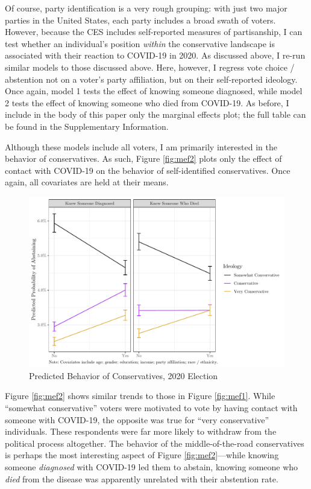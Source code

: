 \documentclass[
  12pt,
]{article}
\begin{document}
Of course, party identification is a very rough grouping: with just two major parties in the United States, each party includes a broad swath of voters. However, because the CES includes self-reported measures of partisanship, I can test whether an individual's position \emph{within} the conservative landscape is associated with their reaction to COVID-19 in 2020. As discussed above, I re-run similar models to those discussed above. Here, however, I regress vote choice / abstention not on a voter's party affiliation, but on their self-reported ideology. Once again, model 1 tests the effect of knowing someone diagnosed, while model 2 tests the effect of knowing someone who died from COVID-19. As before, I include in the body of this paper only the marginal effects plot; the full table can be found in the Supplementary Information.

Although these models include all voters, I am primarily interested in the behavior of conservatives. As such, Figure \ref{fig:mef2} plots only the effect of contact with COVID-19 on the behavior of self-identified conservatives. Once again, all covariates are held at their means.

\begin{figure}[H]

{\centering \includegraphics{theory_paper_files/figure-latex/mef2-c-1} 

}

\caption{\label{fig:mef2}Predicted Behavior of Conservatives, 2020 Election}\label{fig:mef2-c}
\end{figure}

Figure \ref{fig:mef2} shows similar trends to those in Figure \ref{fig:mef1}. While ``somewhat conservative'' voters were motivated to vote by having contact with someone with COVID-19, the opposite was true for ``very conservative'' individuals. These respondents were far more likely to withdraw from the political process altogether. The behavior of the middle-of-the-road conservatives is perhaps the most interesting aspect of Figure \ref{fig:mef2}---while knowing someone \emph{diagnosed} with COVID-19 led them to abstain, knowing someone who \emph{died} from the disease was apparently unrelated with their abstention rate.
\end{document}
